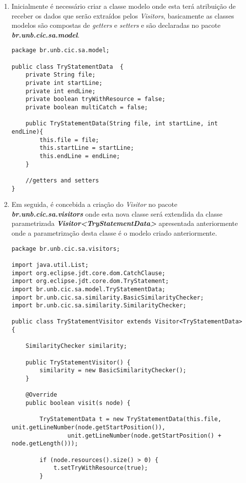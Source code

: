 	\begin{enumerate}
		\item Inicialmente é necessário criar a classe modelo onde esta terá atribuição de receber os dados que serão extraídos pelos \textit{Visitors}, basicamente as classes modelos são compostas de \textit{getters} e \textit{setters} e são declaradas no pacote  \textit{\textbf{br.unb.cic.sa.model}}.
			\begin{lstlisting}
package br.unb.cic.sa.model;

public class TryStatementData  {
	private String file;
	private int startLine;
	private int endLine;
	private boolean tryWithResource = false;
	private boolean multiCatch = false;
	
	public TryStatementData(String file, int startLine, int endLine){
		this.file = file;
		this.startLine = startLine;
		this.endLine = endLine;
	}
	
	//getters and setters
}
			\end{lstlisting}
			
			
		\item Em seguida, é concebida a criação do \textit{Visitor} no pacote \textit{\textbf{br.unb.cic.sa.visitors}} onde esta nova classe será extendida da classe parametrizada \textit{\textbf{Visitor<TryStatementData>}} apresentada anteriormente onde a parametrização desta classe é o modelo criado anteriormente.
			
			\begin{lstlisting}
package br.unb.cic.sa.visitors;

import java.util.List;
import org.eclipse.jdt.core.dom.CatchClause;
import org.eclipse.jdt.core.dom.TryStatement;
import br.unb.cic.sa.model.TryStatementData;
import br.unb.cic.sa.similarity.BasicSimilarityChecker;
import br.unb.cic.sa.similarity.SimilarityChecker;

public class TryStatementVisitor extends Visitor<TryStatementData> {

	SimilarityChecker similarity;

	public TryStatementVisitor() {
		similarity = new BasicSimilarityChecker();
	}

	@Override
	public boolean visit(s node) {

		TryStatementData t = new TryStatementData(this.file, unit.getLineNumber(node.getStartPosition()),
				unit.getLineNumber(node.getStartPosition() + node.getLength()));
		
		if (node.resources().size() > 0) {
			t.setTryWithResource(true);
		}
	

\end{lstlisting}
\end{enumerate}
